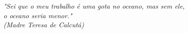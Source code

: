 \begin{epigrafe}
    \vspace*{\fill}
	\begin{flushright}
		\textit{"Sei que o meu trabalho é uma gota no oceano, mas sem ele, \\
		o oceano seria menor."\\
		(Madre Teresa de Calcutá)}
	\end{flushright}
\end{epigrafe}
